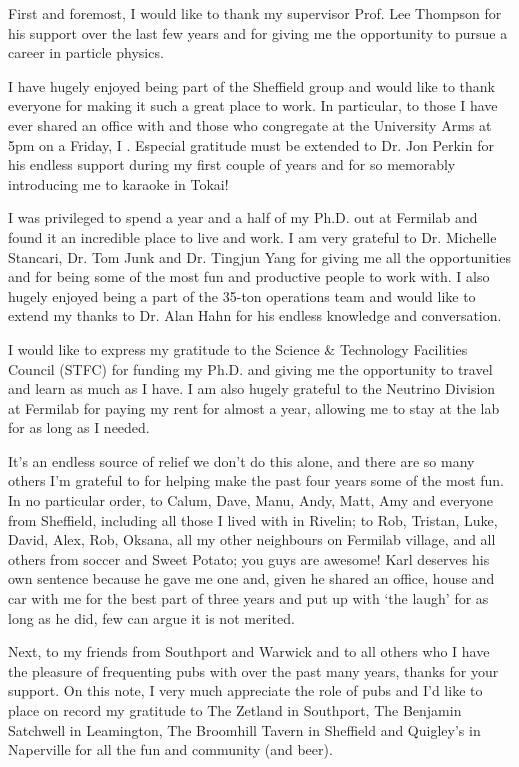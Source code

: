 
\begin{acknowledgements}

  First and foremost, I would like to thank my supervisor Prof. Lee Thompson for his support over the last few years and for giving me the opportunity to pursue a career in particle physics.

  I have hugely enjoyed being part of the Sheffield group and would like to thank everyone for making it such a great place to work.  In particular, to those I have ever shared an office with and those who congregate at the University Arms at 5pm on a Friday, I .  Especial gratitude must be extended to Dr. Jon Perkin for his endless support during my first couple of years and for so memorably introducing me to karaoke in Tokai!

  I was privileged to spend a year and a half of my Ph.D. out at Fermilab and found it an incredible place to live and work.  I am very grateful to Dr. Michelle Stancari, Dr. Tom Junk and Dr. Tingjun Yang for giving me all the opportunities and for being some of the most fun and productive people to work with.  I also hugely enjoyed being a part of the 35-ton operations team and would like to extend my thanks to Dr. Alan Hahn for his endless knowledge and conversation.

  I would like to express my gratitude to the Science \& Technology Facilities Council (STFC) for funding my Ph.D. and giving me the opportunity to travel and learn as much as I have.  I am also hugely grateful to the Neutrino Division at Fermilab for paying my rent for almost a year, allowing me to stay at the lab for as long as I needed.

  It's an endless source of relief we don't do this alone, and there are so many others I'm grateful to for helping make the past four years some of the most fun.  In no particular order, to Calum, Dave, Manu, Andy, Matt, Amy and everyone from Sheffield, including all those I lived with in Rivelin; to Rob, Tristan, Luke, David, Alex, Rob, Oksana, all my other neighbours on Fermilab village, and all others from soccer and Sweet Potato; you guys are awesome!  Karl deserves his own sentence because he gave me one and, given he shared an office, house and car with me for the best part of three years and put up with `the laugh' for as long as he did, few can argue it is not merited.

  Next, to my friends from Southport and Warwick and to all others who I have the pleasure of frequenting pubs with over the past many years, thanks for your support.  On this note, I very much appreciate the role of pubs and I'd like to place on record my gratitude to The Zetland in Southport, The Benjamin Satchwell in Leamington, The Broomhill Tavern in Sheffield and Quigley's in Naperville for all the fun and community (and beer).


\end{acknowledgements}
